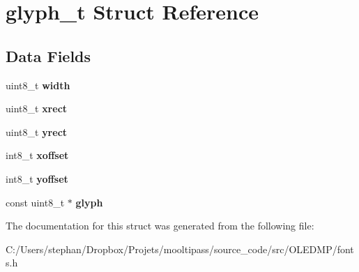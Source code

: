 \hypertarget{structglyph__t}{\section{glyph\-\_\-t Struct Reference}
\label{structglyph__t}
}
\subsection*{Data Fields}
\begin{DoxyCompactItemize}
\item 
\hypertarget{structglyph__t_a09a2a45f731b02946ff6d3cd15c1a476}{uint8\-\_\-t {\bfseries width}}\label{structglyph__t_a09a2a45f731b02946ff6d3cd15c1a476}

\item 
\hypertarget{structglyph__t_a46d1f5dd7c1a75b29bd8ff4572263129}{uint8\-\_\-t {\bfseries xrect}}\label{structglyph__t_a46d1f5dd7c1a75b29bd8ff4572263129}

\item 
\hypertarget{structglyph__t_a59c390ac18717a7ff28f85cc8a829a8e}{uint8\-\_\-t {\bfseries yrect}}\label{structglyph__t_a59c390ac18717a7ff28f85cc8a829a8e}

\item 
\hypertarget{structglyph__t_a248c78bc36899ea7581e379d926f480a}{int8\-\_\-t {\bfseries xoffset}}\label{structglyph__t_a248c78bc36899ea7581e379d926f480a}

\item 
\hypertarget{structglyph__t_a1f3726a53d108483e5f64b4cf1edda88}{int8\-\_\-t {\bfseries yoffset}}\label{structglyph__t_a1f3726a53d108483e5f64b4cf1edda88}

\item 
\hypertarget{structglyph__t_a2bad71d1abe181892d7ec3a7223b0035}{const uint8\-\_\-t $\ast$ {\bfseries glyph}}\label{structglyph__t_a2bad71d1abe181892d7ec3a7223b0035}

\end{DoxyCompactItemize}


The documentation for this struct was generated from the following file\-:\begin{DoxyCompactItemize}
\item 
C\-:/\-Users/stephan/\-Dropbox/\-Projets/mooltipass/source\-\_\-code/src/\-O\-L\-E\-D\-M\-P/fonts.\-h\end{DoxyCompactItemize}
